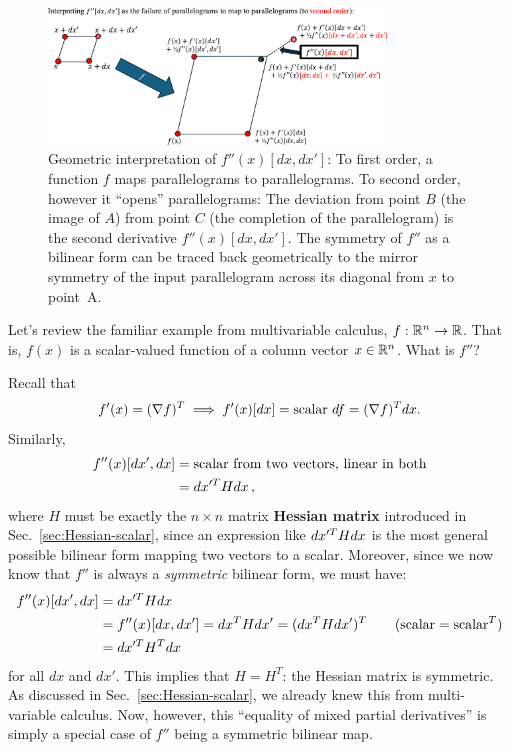 \begin{figure}
\begin{center}
\includegraphics[width=0.8\textwidth]{figures/second-derivative.pdf}
\end{center}
\caption{Geometric interpretation of $f''(x)[dx,dx']$:
To first order, a function $f$ maps parallelograms to parallelograms.  To second order, however it ``opens'' parallelograms: The deviation from point $B$ (the image of $A$) from point $C$ (the completion of the parallelogram) is the second
derivative $f''(x)[dx,dx']$.  
The symmetry of $f''$ as a bilinear form can be traced back  geometrically 
to the mirror symmetry of the input parallelogram across its diagonal
from $x$ to point~A. \label{fig:second-deriv}
}
\end{figure}

\begin{example}
    Let's review the familiar example from multivariable calculus, $f: \mathbb R^n \to \mathbb R$. That is, $f(x)$ is a scalar-valued function of a column vector $x\in \mathbb R^n$.  What is $f''$?
\end{example}
Recall that 
\[
f'(x) = (\nabla f)^T \implies f'(x) [d x] = \text{scalar } d f = (\nabla f)^T d x. 
\]
Similarly, 
\begin{align*}
    f''(x) [d x', d x] &= \text{scalar from two vectors, linear in both} \\
    &= d x'^T H d x \, ,
\end{align*}
where $H$ must be exactly the $n \times n$ matrix  \textbf{Hessian matrix} introduced in Sec.~\ref{sec:Hessian-scalar}, since an expression like $d x'^T H d x$ is the most general possible bilinear form mapping two vectors to a scalar.  Moreover, since we now know that $f''$ is always a \emph{symmetric} bilinear form, we must have:
\begin{align*}
f''(x) [d x', d x] &=d x'^T H d x \\
&= f''(x) [d x, d x'] = d x^T H d x' =
     (d x^T H d x')^T  \qquad (\mathrm{scalar} = \mathrm{scalar}^T)\\
    &= d x'^T H^T d x 
\end{align*}
for all $dx$ and $dx'$.
This implies that $H = H^T$: the Hessian matrix is symmetric.  As discussed in Sec.~\ref{sec:Hessian-scalar}, we already knew this from multi-variable calculus.  Now, however, this ``equality of mixed partial derivatives'' is simply a special case of $f''$ being a symmetric bilinear map.

